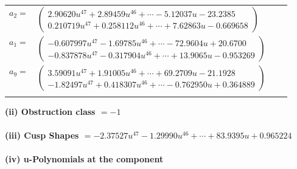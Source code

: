 \documentclass[1p]{elsarticle_modified}
\theoremstyle{definition}
\begin{document}
\begin{tabular}{m{7pt} m{180pt} m{7pt} m{180pt} }
\flushright $a_{2}=$&$\begin{pmatrix}2.90620 u^{47}+2.89459 u^{46}+\cdots-5.12037 u-23.2385\\0.210719 u^{47}+0.258112 u^{46}+\cdots+7.62863 u-0.669658\end{pmatrix}$ \\
\flushright $a_{1}=$&$\begin{pmatrix}-0.607997 u^{47}-1.69785 u^{46}+\cdots-72.9604 u+20.6700\\-0.837878 u^{47}-0.317904 u^{46}+\cdots+13.9065 u-0.953269\end{pmatrix}$ \\
\flushright $a_{9}=$&$\begin{pmatrix}3.59091 u^{47}+1.91005 u^{46}+\cdots+69.2709 u-21.1928\\-1.82497 u^{47}+0.418307 u^{46}+\cdots-0.762950 u+0.364889\end{pmatrix}$\\&\end{tabular}
\flushleft \textbf{(ii) Obstruction class $= -1$}\\~\\
\flushleft \textbf{(iii) Cusp Shapes $= -2.37527 u^{47}-1.29990 u^{46}+\cdots+83.9395 u+0.965224$}\\~\\
\newpage\renewcommand{\arraystretch}{1}
\flushleft \textbf{(iv) u-Polynomials at the component}\newline \\
\end{document}
